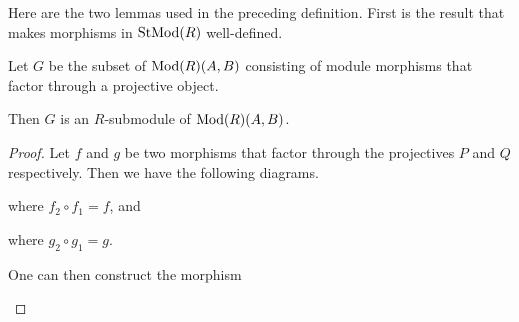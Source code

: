 Here are the two lemmas used in the preceding definition. First is the result that makes morphisms in \( \operatorname{StMod}(R) \) well-defined.

\begin{lemma}
    \label{lem:morphisms_factoring_through_projectives_r-submodule}
    Let \( G \) be the subset of \( \operatorname{Mod}(R)(A, B) \) consisting of module morphisms that factor through a projective object.

    Then \( G \) is an \( R \)-submodule of \( \operatorname{Mod}(R)(A, B) \).
\end{lemma}
\begin{proof}
    Let \( f \) and \( g \) be two morphisms that factor through the projectives \( P \) and \( Q \) respectively. Then we have the following diagrams.

    \begin{center}
    \end{center}
    where \( f_2 \circ f_1 = f \), and
    \begin{center}
    \end{center}
    where \( g_2 \circ g_1 = g \).

    One can then construct the morphism
    \begin{center}
    \end{center}


\end{proof}
